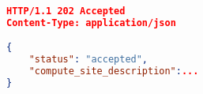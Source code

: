 

\begin{lstlisting}[language=json,firstnumber=1]
HTTP/1.1 202 Accepted
Content-Type: application/json

{
    "status": "accepted",
    "compute_site_description":...
}

\end{lstlisting}